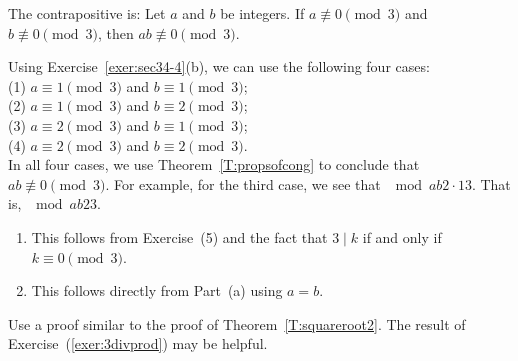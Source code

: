 \begin{list}{\bf{\ref{exer:congto3}.}}
\item The contrapositive is:  Let $a$ and $b$ be integers.  If $a \not\equiv 0 \pmod3$ and 
$b \not\equiv 0 \pmod 3$, then $ab \not\equiv 0 \pmod 3$.

Using Exercise~\ref{exer:sec34-4}(b), we can use the following four cases: \\ 
(1) $a \equiv 1 \pmod 3$ and $b \equiv 1 \pmod 3$;  \\ 
(2) $a \equiv 1 \pmod 3$ and $b \equiv 2 \pmod 3$; \\
(3) $a \equiv 2 \pmod 3$ and $b \equiv 1 \pmod 3$;  \\ 
(4) $a \equiv 2 \pmod 3$ and $b \equiv 2 \pmod 3$. \\
In all four cases, we use Theorem~\ref{T:propsofcong} to conclude that 
$ab \not\equiv 0 \pmod 3$.  For example, for the third case, we see that $\mod{ab}{2 \cdot 1}{3}$.  That is, $\mod{ab}{2}{3}$.
\end{list}


\begin{list}{\bf{\ref{exer:3divprod}.}}
\item \begin{enumerate}
\item This follows from Exercise~(5) and the fact that  $3 \mid k$ if and only if  
$k \equiv 0 \pmod 3$.
\item This follows directly from Part~(a) using $a = b$.
\end{enumerate}
\end{list}


\begin{list}{\bf{\ref{exer:sqrt3}.}}
\item \begin{list}{\bf{(a)}}
\item Use a proof similar to the proof of Theorem~\ref{T:squareroot2}.  The result of Exercise~(\ref{exer:3divprod}) may be helpful.
\end{list}
\end{list}



